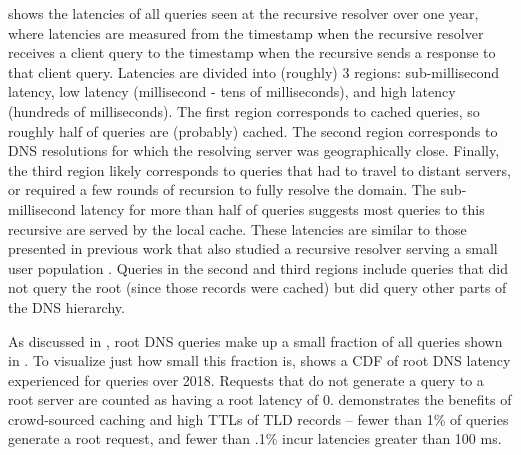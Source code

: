 \documentclass[sigconf,letterpaper,nonacm,10pt,anonymous]{acmart}
\begin{document}
 shows the latencies of all queries seen
at the recursive resolver over one year, where latencies are measured
from the timestamp when the recursive resolver receives a client query
to the timestamp when the recursive sends a response to that client
query. Latencies are divided into (roughly) 3 regions: sub-millisecond
latency, low latency (millisecond - tens of milliseconds), and high
latency (hundreds of milliseconds). The first region corresponds to
cached queries, so roughly half of queries are (probably) cached. The
second region corresponds to DNS resolutions for which the resolving
server was geographically close. Finally, the third region likely
corresponds to queries that had to travel to distant servers, or
required a few rounds of recursion to fully resolve the domain. The
sub-millisecond latency for more than half of queries suggests most
queries to this recursive are served by the local cache. These latencies
are similar to those presented in previous work that also studied a
recursive resolver serving a small user population
\cite{callahan2013modern}. Queries in the second and third regions
include queries that did not query the root (since those records were
cached) but did query other parts of the DNS hierarchy.

As discussed in , root DNS queries make up a
small fraction of all queries shown in .
To visualize just how small this fraction is,
 shows a CDF of root DNS latency
experienced for queries over 2018. Requests that do not generate a query
to a root server are counted as having a root latency of 0.
 demonstrates the benefits of
crowd-sourced caching and high TTLs of TLD records -- fewer than 1\% of
queries generate a root request, and fewer than .1\% incur latencies
greater than 100 ms.
\end{document}
